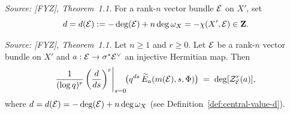 \begin{definition}
  \label{def:central-value-d}
  \textit{Source: [FYZ], Theorem~1.1.}
  For a rank-\(n\) vector bundle \(\mathcal{E}\) on \(X'\), set
  \[
    d = d(\mathcal{E}) := -\deg(\mathcal{E}) + n \deg \omega_X = -\chi(X', \mathcal{E}) \in \mathbf{Z}.
  \]
\end{definition}

\begin{theorem}
  \label{thm:higher-siegel-weil}
  \textit{Source: [FYZ], Theorem~1.1.}
  Let \(n \geq 1\) and \(r \geq 0\). Let \(\mathcal{E}\) be a rank-\(n\) vector bundle on
  \(X'\) and \(a : \mathcal{E} \to \sigma^* \mathcal{E}^\vee\) an injective Hermitian map. Then
  \[
    \frac{1}{(\log q)^r}
    \left(\frac{d}{ds}\right)^r\!\Bigg|_{s=0}
    \!\bigl(q^{d s}\,\widetilde{E}_a(m(\mathcal{E}), s, \Phi)\bigr)
    \;=\; \deg[\mathcal{Z}_{\mathcal{E}}^r(a)],
  \]
  where \(d = d(\mathcal{E}) = -\deg(\mathcal{E}) + n\deg\omega_X\) (see Definition~\ref{def:central-value-d}).
\end{theorem}


